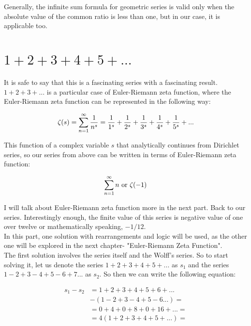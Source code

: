 \documentclass{beamer}
\begin{document}
Generally, the infinite sum formula for geometric series is valid only when the absolute value
of the common ratio is less than one, but in our case, it is applicable too.
\newpage
\section {$1+2+3+4+5+...$}

It is safe to say that this is a fascinating series with a fascinating result. $1+2+3+...$ is a particular
case of Euler-Riemann zeta function, where the Euler-Riemann zeta function can be represented in
the following way:

\begin{equation}
  \zeta(s)=\sum_{n=1}^{\infty} \frac{1}{n^s}=\frac{1}{1^s}+\frac{1}{2^s}+\frac{1}{3^s}+
  \frac{1}{4^s}+\frac{1}{5^s}+...\\
  \label{zetaf}
\end{equation}

This function of a complex variable $s$ that analytically continues from Dirichlet series, so our series
from above can be written in terms of Euler-Riemann zeta function:

\begin{equation}
  \sum_{n=1}^{\infty} n \text{ or } \zeta(-1)\\
  \end{equation}

I will talk about Euler-Riemann zeta function more in the next part. Back to our series. Interestingly enough,
the finite value of this series is negative value of one over twelve or mathematically speaking,
$-1/12$.\\

In this part, one solution with rearrangements and logic will be used, as the other one will be
explored in the next chapter- "Euler-Riemann Zeta Function".\\

The first solution involves the series itself and the Wolff's series. So to start solving it, let us denote
the series $1+2+3+4+5+...$ as $s_1$ and the series $1-2+3-4+5-6+7...$ as $s_2$. So then
we can write the following equation:

\begin{align*}
  s_1-s_2&=1+2+3+4+5+6+...\\
  &-(1-2+3-4+5-6...)=\\
  &=0+4+0+8+0+16+...=\\
  &=4(1+2+3+4+5+...)=
\end{align*}
\end{document}
